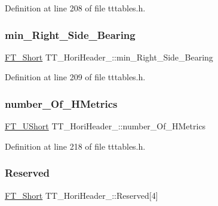 Definition at line 208 of file tttables.\+h.

\mbox{\label{struct_t_t___hori_header___a64144cdd595e8e8de119b78539bf2fa7}} 
\subsubsection{\texorpdfstring{min\_Right\_Side\_Bearing}{min\_Right\_Side\_Bearing}}
{\footnotesize\ttfamily \mbox{\hyperlink{fttypes_8h_aa7279be89046a2563cd3d4d6651fbdcf}{F\+T\+\_\+\+Short}} T\+T\+\_\+\+Hori\+Header\+\_\+\+::min\+\_\+\+Right\+\_\+\+Side\+\_\+\+Bearing}



Definition at line 209 of file tttables.\+h.

\mbox{\label{struct_t_t___hori_header___aac3ecb9ba7c13436a663b91765e89647}} 
\subsubsection{\texorpdfstring{number\_Of\_HMetrics}{number\_Of\_HMetrics}}
{\footnotesize\ttfamily \mbox{\hyperlink{fttypes_8h_a937f6c17cf5ffd09086d8610c37b9f58}{F\+T\+\_\+\+U\+Short}} T\+T\+\_\+\+Hori\+Header\+\_\+\+::number\+\_\+\+Of\+\_\+\+H\+Metrics}



Definition at line 218 of file tttables.\+h.

\mbox{\label{struct_t_t___hori_header___af2a2b374d8f81771fb75d3bdc96bcbf7}} 
\subsubsection{\texorpdfstring{Reserved}{Reserved}}
{\footnotesize\ttfamily \mbox{\hyperlink{fttypes_8h_aa7279be89046a2563cd3d4d6651fbdcf}{F\+T\+\_\+\+Short}} T\+T\+\_\+\+Hori\+Header\+\_\+\+::\+Reserved\mbox{[}4\mbox{]}}



